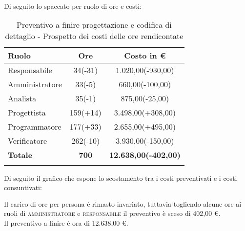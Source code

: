 \documentclass[../piano_di_progetto.tex]{subfiles}
\begin{document}
Di seguito lo spaccato per ruolo di ore e costi:
\begin{center}
	\begin{longtable}{|l|c|c|}
		\hline
		\rowcolor{lightgray}
		\textbf{Ruolo} & \textbf{Ore} & \textbf{Costo in €}\\
		\hline
		
		Responsabile & 34(-31) & 1.020,00(-930,00) \\
		Amministratore & 33(-5) & 660,00(-100,00) \\
		Analista & 35(-1) & 875,00(-25,00) \\
		Progettista & 159(+14) & 3.498,00(+308,00) \\
		Programmatore & 177(+33) & 2.655,00(+495,00) \\
		Verificatore & 262(-10) & 3.930,00(-150,00) \\
		\hline
		\textbf{Totale} & \textbf{700} & \textbf{12.638,00(-402,00)}\\
		\hline
		\rowcolor{white}
		\caption{Preventivo a finire progettazione e codifica di dettaglio - Prospetto dei costi delle ore rendicontate}
	\end{longtable}
\end{center}

Di seguito il grafico che espone lo scostamento tra i costi preventivati e i costi consuntivati:



\noindent Il carico di ore per persona è rimasto invariato, tuttavia togliendo alcune ore ai ruoli di \textsc{amministratore} e \textsc{responsabile} il preventivo è sceso di 402,00 €.\\
Il preventivo a finire è ora di 12.638,00 €. 
\end{document}
